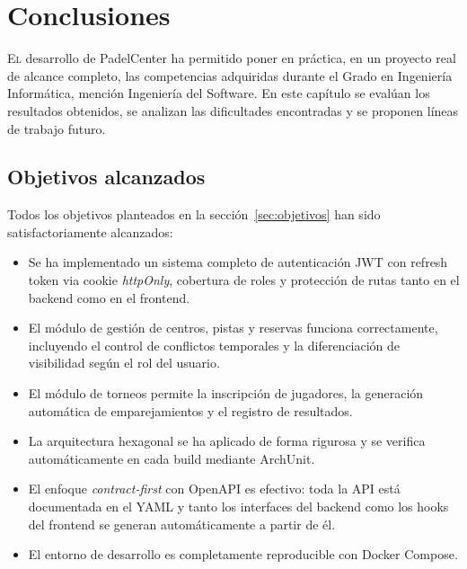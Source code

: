 \chapter{Conclusiones}
\label{chap:conclusions}

\lettrine{E}{l} desarrollo de PadelCenter ha permitido poner en práctica, en un
proyecto real de alcance completo, las competencias adquiridas durante el Grado
en Ingeniería Informática, mención Ingeniería del Software. En este capítulo se
evalúan los resultados obtenidos, se analizan las dificultades encontradas y se
proponen líneas de trabajo futuro.

\section{Objetivos alcanzados}
\label{sec:objetivos_alcanzados}

Todos los objetivos planteados en la sección~\ref{sec:objetivos} han sido
satisfactoriamente alcanzados:

\begin{itemize}
  \item Se ha implementado un sistema completo de autenticación JWT con refresh
    token via cookie \textit{httpOnly}, cobertura de roles y protección de rutas
    tanto en el backend como en el frontend.

  \item El módulo de gestión de centros, pistas y reservas funciona correctamente,
    incluyendo el control de conflictos temporales y la diferenciación de
    visibilidad según el rol del usuario.

  \item El módulo de torneos permite la inscripción de jugadores, la generación
    automática de emparejamientos y el registro de resultados.

  \item La arquitectura hexagonal se ha aplicado de forma rigurosa y se verifica
    automáticamente en cada build mediante ArchUnit.

  \item El enfoque \textit{contract-first} con OpenAPI es efectivo: toda la API
    está documentada en el YAML y tanto los interfaces del backend como los hooks
    del frontend se generan automáticamente a partir de él.

  \item El entorno de desarrollo es completamente reproducible con Docker Compose.
\end{itemize}

